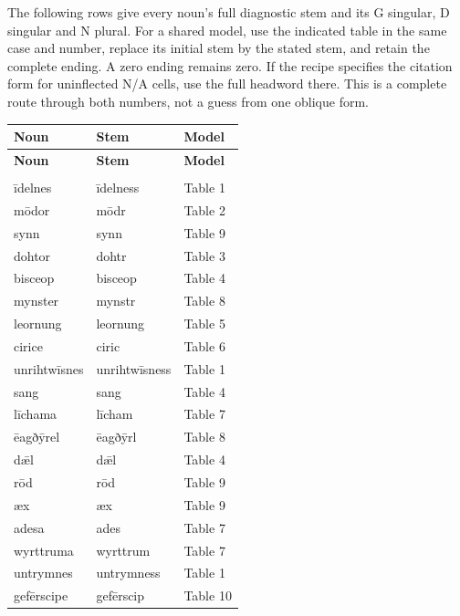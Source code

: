 The following rows give every noun’s full diagnostic stem and its G singular, D singular and N plural. For a shared model, use the indicated table in the same case and number, replace its initial stem by the stated stem, and retain the complete ending. A zero ending remains zero. If the recipe specifies the citation form for uninflected N/\allowbreak{}A cells, use the full headword there. This is a complete route through both numbers, not a guess from one oblique form.

\par\begingroup
\fontsize{10.5}{13.2}\selectfont
\setlength{\LTleft}{0pt}\setlength{\LTright}{\fill}
\begin{longtable}{@{}>{\raggedright\arraybackslash}p{48mm}>{\raggedright\arraybackslash}p{48mm}>{\raggedright\arraybackslash}p{22.37mm}@{}}
\toprule
\textbf{Noun} & \textbf{Stem} & \textbf{Model} \\
\midrule
\endfirsthead
\toprule
\textbf{Noun} & \textbf{Stem} & \textbf{Model} \\
\midrule
\endhead
\midrule
\multicolumn{3}{r}{\footnotesize Continued on the following page.}\\
\endfoot
\bottomrule
\endlastfoot
īdelnes & īdelness & Table 1 \\
mōdor & mōdr & Table 2 \\
synn & synn & Table 9 \\
dohtor & dohtr & Table 3 \\
bisceop & bisceop & Table 4 \\
mynster & mynstr & Table 8 \\
leornung & leornung & Table 5 \\
cirice & ciric & Table 6 \\
unrihtwīsnes & unrihtwīsness & Table 1 \\
sang & sang & Table 4 \\
līchama & līcham & Table 7 \\
ēagðȳrel & ēagðȳrl & Table 8 \\
dǣl & dǣl & Table 4 \\
rōd & rōd & Table 9 \\
æx & æx & Table 9 \\
adesa & ades & Table 7 \\
wyrttruma & wyrttrum & Table 7 \\
untrymnes & untrymness & Table 1 \\
gefērscipe & gefērscip & Table 10 \\

\end{longtable}
